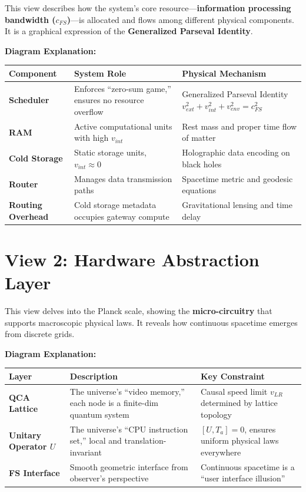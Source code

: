 This view describes how the system's core resource---\textbf{information processing bandwidth ($c_{FS}$)}---is allocated and flows among different physical components. It is a graphical expression of the \textbf{Generalized Parseval Identity}.

\textbf{Diagram Explanation:}

\begin{table}[h]
\centering
\begin{tabular}{|l|l|l|}
\hline
\textbf{Component} & \textbf{System Role} & \textbf{Physical Mechanism} \\
\hline
\textbf{Scheduler} & Enforces ``zero-sum game,'' ensures no resource overflow & Generalized Parseval Identity $v_{ext}^2 + v_{int}^2 + v_{env}^2 = c_{FS}^2$ \\
\hline
\textbf{RAM} & Active computational units with high $v_{int}$ & Rest mass and proper time flow of matter \\
\hline
\textbf{Cold Storage} & Static storage units, $v_{int} \approx 0$ & Holographic data encoding on black holes \\
\hline
\textbf{Router} & Manages data transmission paths & Spacetime metric and geodesic equations \\
\hline
\textbf{Routing Overhead} & Cold storage metadata occupies gateway compute & Gravitational lensing and time delay \\
\hline
\end{tabular}
\end{table}

\section{View 2: Hardware Abstraction Layer}

This view delves into the Planck scale, showing the \textbf{micro-circuitry} that supports macroscopic physical laws. It reveals how continuous spacetime emerges from discrete grids.

\textbf{Diagram Explanation:}

\begin{table}[h]
\centering
\begin{tabular}{|l|l|l|}
\hline
\textbf{Layer} & \textbf{Description} & \textbf{Key Constraint} \\
\hline
\textbf{QCA Lattice} & The universe's ``video memory,'' each node is a finite-dim quantum system & Causal speed limit $v_{LR}$ determined by lattice topology \\
\hline
\textbf{Unitary Operator $U$} & The universe's ``CPU instruction set,'' local and translation-invariant & $[U, T_a] = 0$, ensures uniform physical laws everywhere \\
\hline
\textbf{FS Interface} & Smooth geometric interface from observer's perspective & Continuous spacetime is a ``user interface illusion'' \\
\hline
\end{tabular}
\end{table}

